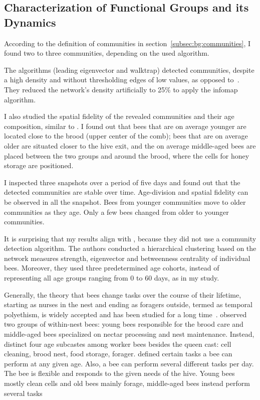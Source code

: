 \subsection{Characterization of Functional Groups and its Dynamics}
According to the definition of communities in section~\ref{subsec:bg:communities}, I found two to three communities, depending on the used algorithm.

The algorithms (leading eigenvector and walktrap) detected communities, despite a high density and without thresholding edges of low values, as opposed to~\textcite{mersch2013tracking}.
They reduced the network's density artificially to 25\% to apply the infomap algorithm.

I also studied the spatial fidelity of the revealed communities and their age composition, similar to \textcite{baracchi2014socio}. I found out that bees that are on average younger are located close to the brood (upper center of the comb); bees that are on average older are situated closer to the hive exit, and the on average middle-aged bees are placed between the two groups and around the brood, where the cells for honey storage are positioned.

I inspected three snapshots over a period of five days and found out that the detected communities are stable over time. Age-division and spatial fidelity can be observed in all the snapshot.
Bees from younger communities move to older communities as they age. Only a few bees changed from older to younger communities.

It is surprising that my results align with \textcite{baracchi2014socio}, because they did not use a community detection algorithm. The authors conducted a hierarchical clustering based on the network measures strength, eigenvector and betweenness centrality of individual bees. Moreover, they used three predetermined age cohorts, instead of representing all age groups ranging from 0 to 60 days, as in my study.

Generally, the theory that bees change tasks over the course of their lifetime, starting as nurses in the nest and ending as foragers outside, termed as temporal polyethism,  is widely accepted and has been studied for a long time~\cite{seeley1982adaptive, johnson2008within, lindauer1952beitrag}.
\textcite{johnson2008within} observed two groups of within-nest bees: young bees responsible for the brood care and middle-aged bees specialized on nectar processing and nest maintenance. Instead, \textcite{seeley1982adaptive} distinct four age subcastes among worker bees besides the queen cast: cell cleaning, brood nest, food storage, forager. \textcite{lindauer1952beitrag} defined certain tasks a bee can perform at any given age. Also, a bee can perform several different tasks per day. The bee is flexible and responds to the given needs of the hive. Young bees mostly clean cells and old bees mainly forage, middle-aged bees instead perform several tasks

